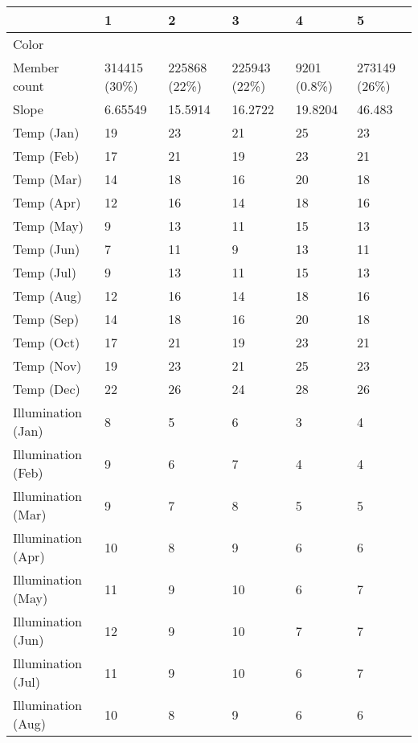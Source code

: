 \begin{table}[]
  \centering
	    \begin{tabular}{|p{5cm}|p{2cm}|p{2cm}|p{2cm}|p{2cm}|p{2cm}|}
		\hline	
  	     & \textbf{1} &  \textbf{2} & \textbf{3} & \textbf{4} & \textbf{5} \\
		\hline
  	    Color & \cellcolor{cluster_1} & \cellcolor{cluster_2} & \cellcolor{cluster_3} & \cellcolor{cluster_4} & \cellcolor{cluster_5} \\
		\hline
  	    Member count & 314415 (30\%)  & 225868 (22\%) & 225943 (22\%)  & 9201 (0.8\%) & 273149 (26\%) \\
		\hline
  	    Slope & 6.65549 & 15.5914 & 16.2722 & 19.8204 & 46.483 \\
		\hline
  	    Temp (Jan) & 19 & 23 & 21 & 25 & 23 \\
		\hline
  	    Temp (Feb) & 17 & 21 & 19 & 23 & 21 \\
		\hline
  	    Temp (Mar) & 14 & 18 & 16 & 20 & 18 \\
		\hline
  	    Temp (Apr) & 12 & 16 & 14 & 18 & 16 \\
		\hline
  	    Temp (May) & 9 & 13 & 11 & 15 & 13 \\
		\hline
		Temp (Jun) & 7 & 11 & 9 & 13 & 11 \\
		\hline
		Temp (Jul) & 9 & 13 & 11 & 15 & 13 \\
		\hline
		Temp (Aug) & 12 & 16 & 14 & 18 & 16 \\
		\hline
		Temp (Sep) & 14 & 18 & 16 & 20 & 18 \\
		\hline
		Temp (Oct) & 17 & 21 & 19 & 23 & 21 \\
		\hline
		Temp (Nov) & 19 & 23 & 21 & 25 & 23 \\
		\hline
		Temp (Dec) & 22 & 26 & 24 & 28 & 26 \\
		\hline
  	    Illumination (Jan) & 8 & 5 & 6 & 3 & 4 \\
		\hline
  	    Illumination (Feb) & 9 & 6 & 7 & 4 & 4 \\
		\hline
  	    Illumination (Mar) & 9 & 7 & 8 & 5 & 5 \\
		\hline
  	    Illumination (Apr) & 10 & 8 & 9 & 6 & 6 \\
		\hline
  	    Illumination (May) & 11 & 9 & 10 & 6 & 7 \\
		\hline
		Illumination (Jun) & 12 & 9 & 10 & 7 & 7 \\
		\hline
		Illumination (Jul) & 11 & 9 & 10 & 6 & 7 \\
		\hline
		Illumination (Aug) & 10 & 8 & 9 & 6 & 6 \\

\end{tabular}
\end{table}

